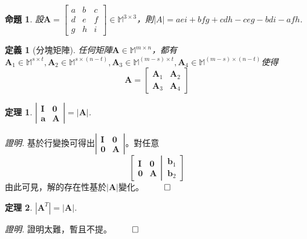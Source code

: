 \documentclass[12pt]{article}
\newtheorem{definition}{定義}
\newtheorem*{theorem}{定理}
\newtheorem*{proposition}{命題}
\renewenvironment*{proof}{\textit{證明.}}{\hfill$\qed$}
\begin{document}
    \begin{proposition}
        設$\mathbf{A}=\begin{bmatrix}
            a&b&c\\d&e&f\\g&h&i
        \end{bmatrix}\in\mathbb{M}^{3\times 3}$，則$|A|=aei+bfg+cdh-ceg-bdi-afh$.
    \end{proposition}

    \begin{definition}[分塊矩陣]
        任何矩陣$\mathbf{A}\in\mathbb{M}^{m\times n}$，都有$\mathbf{A}_1\in\mathbb{M}^{s\times t},\mathbf{A}_2\in\mathbb{M}^{s\times (n-t)},\mathbf{A}_3\in\mathbb{M}^{(m-s)\times t}, \mathbf{A}_4\in\mathbb{M}^{(m-s)\times (n-t)}$使得$$\mathbf{A}=\begin{bmatrix}
            \mathbf{A}_1&\mathbf{A}_2\\\mathbf{A}_3&\mathbf{A}_4
        \end{bmatrix}$$
    \end{definition}
    
    \begin{theorem}
        $\left|\begin{matrix}
            \mathbf{I}&\mathbf{0}\\\mathbf{a}&\mathbf{A}
        \end{matrix}\right|=|\mathbf{A}|$.
    \end{theorem}
    \begin{proof}
        基於行變換可得出$\left|\begin{matrix}
            \mathbf{I}&\mathbf{0}\\\mathbf{0}&\mathbf{A}
        \end{matrix}\right|$。對任意$$\left[\begin{matrix}
            \mathbf{I}&\mathbf{0}\\
            \mathbf{0}&\mathbf{A}
        \end{matrix}\left|
        \, 
        \begin{matrix}
            \mathbf{b}_1\\\mathbf{b}_2
        \end{matrix}\right. \right]$$
        由此可見，解的存在性基於$|\mathbf{A}|$變化。
    \end{proof}

    \begin{theorem}
        $|\mathbf{A}^T|=|\mathbf{A}|$.
    \end{theorem}
    \begin{proof}
        證明太難，暫且不提。
    \end{proof}
\end{document}
